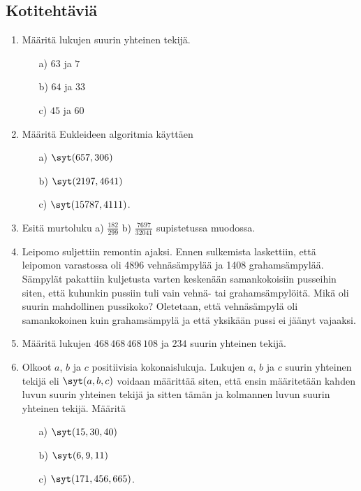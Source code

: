 
\subsection*{Kotitehtäviä}


\begin{enumerate}

\item Määritä lukujen suurin yhteinen tekijä.
\begin{itemize}
\item[a)] $63$ ja $7$
\item[b)] $64$ ja $33$
\item[c)] $45$ ja $60$
\end{itemize}

\item Määritä Eukleideen algoritmia käyttäen
\begin{itemize}
\item[a)] $\syt(657,306)$
\item[b)] $\syt(2197,4641)$
\item[c)] $\syt(15787,4111)$.
\end{itemize}

\item
Esitä murtoluku  a) $\frac{182}{299}$  b) $\frac{7697}{32041}$  supistetussa muodossa.

\item Leipomo suljettiin remontin ajaksi. Ennen sulkemista laskettiin, että leipomon varastossa oli 4896 vehnäsämpylää ja 1408 grahamsämpylää. Sämpylät pakattiin kuljetusta varten keskenään samankokoisiin pusseihin siten, että kuhunkin pussiin tuli vain vehnä- tai grahamsämpylöitä. Mikä oli suurin mahdollinen pussikoko? Oletetaan, että vehnäsämpylä oli samankokoinen kuin grahamsämpylä ja että yksikään pussi ei jäänyt vajaaksi.

\item Määritä lukujen $468\, 468\, 468\, 108$ ja $234$ suurin yhteinen tekijä.

\item Olkoot $a$, $b$ ja $c$ positiivisia kokonaislukuja. Lukujen $a$, $b$ ja $c$ suurin yhteinen tekijä eli $\syt(a,b,c)$ voidaan määrittää siten, että ensin määritetään kahden luvun suurin yhteinen tekijä ja sitten tämän ja kolmannen luvun suurin yhteinen tekijä. Määritä
\begin{itemize}
\item[a)] $\syt(15,30,40)$
\item[b)] $\syt(6,9,11)$
\item[c)] $\syt(171,456,665)$.
\end{itemize}


\end{enumerate}
